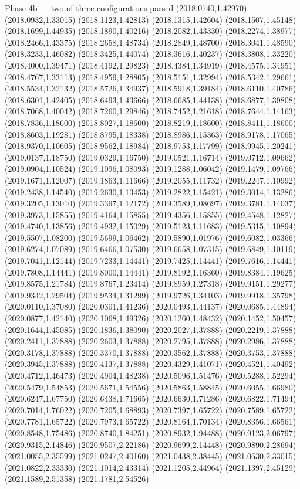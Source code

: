 \documentclass[aspectratio=169,10pt]{beamer}
\begin{document}
\begin{frame}[t]{Phase 4b — two of three configurations passed}
(2018.0740,1.42970) (2018.0932,1.33015) (2018.1123,1.42813) (2018.1315,1.42604) (2018.1507,1.45148) (2018.1699,1.44935) (2018.1890,1.40216) (2018.2082,1.43330) (2018.2274,1.38977) (2018.2466,1.43375) (2018.2658,1.48734) (2018.2849,1.48700) (2018.3041,1.48590) (2018.3233,1.46082) (2018.3425,1.44074) (2018.3616,1.40237) (2018.3808,1.33220) (2018.4000,1.39471) (2018.4192,1.29823) (2018.4384,1.34919) (2018.4575,1.34951) (2018.4767,1.33113) (2018.4959,1.28805) (2018.5151,1.32994) (2018.5342,1.29661) (2018.5534,1.32132) (2018.5726,1.34937) (2018.5918,1.39184) (2018.6110,1.40786) (2018.6301,1.42405) (2018.6493,1.43666) (2018.6685,1.44138) (2018.6877,1.39808) (2018.7068,1.40042) (2018.7260,1.29846) (2018.7452,1.21618) (2018.7644,1.14163) (2018.7836,1.18600) (2018.8027,1.18600) (2018.8219,1.18600) (2018.8411,1.18600) (2018.8603,1.19281) (2018.8795,1.18338) (2018.8986,1.15363) (2018.9178,1.17065) (2018.9370,1.10605) (2018.9562,1.18984) (2018.9753,1.17799) (2018.9945,1.20241) (2019.0137,1.18750) (2019.0329,1.16750) (2019.0521,1.16714) (2019.0712,1.09662) (2019.0904,1.10524) (2019.1096,1.08093) (2019.1288,1.06042) (2019.1479,1.09766) (2019.1671,1.12007) (2019.1863,1.11666) (2019.2055,1.11732) (2019.2247,1.10992) (2019.2438,1.14540) (2019.2630,1.13453) (2019.2822,1.15421) (2019.3014,1.13286) (2019.3205,1.13010) (2019.3397,1.12172) (2019.3589,1.08697) (2019.3781,1.14037) (2019.3973,1.15855) (2019.4164,1.15855) (2019.4356,1.15855) (2019.4548,1.12827) (2019.4740,1.13856) (2019.4932,1.15029) (2019.5123,1.11683) (2019.5315,1.10894) (2019.5507,1.08200) (2019.5699,1.06462) (2019.5890,1.01976) (2019.6082,1.03366) (2019.6274,1.07089) (2019.6466,1.07530) (2019.6658,1.07315) (2019.6849,1.10119) (2019.7041,1.12144) (2019.7233,1.14441) (2019.7425,1.14441) (2019.7616,1.14441) (2019.7808,1.14441) (2019.8000,1.14441) (2019.8192,1.16360) (2019.8384,1.19625) (2019.8575,1.21784) (2019.8767,1.23414) (2019.8959,1.27318) (2019.9151,1.29277) (2019.9342,1.29504) (2019.9534,1.31299) (2019.9726,1.34103) (2019.9918,1.35798) (2020.0110,1.37080) (2020.0301,1.41236) (2020.0493,1.44137) (2020.0685,1.44894) (2020.0877,1.42140) (2020.1068,1.49326) (2020.1260,1.48432) (2020.1452,1.50457) (2020.1644,1.45085) (2020.1836,1.38090) (2020.2027,1.37888) (2020.2219,1.37888) (2020.2411,1.37888) (2020.2603,1.37888) (2020.2795,1.37888) (2020.2986,1.37888) (2020.3178,1.37888) (2020.3370,1.37888) (2020.3562,1.37888) (2020.3753,1.37888) (2020.3945,1.37888) (2020.4137,1.37888) (2020.4329,1.41071) (2020.4521,1.40492) (2020.4712,1.46473) (2020.4904,1.48238) (2020.5096,1.51476) (2020.5288,1.52294) (2020.5479,1.54853) (2020.5671,1.54556) (2020.5863,1.58845) (2020.6055,1.66980) (2020.6247,1.67750) (2020.6438,1.71665) (2020.6630,1.71286) (2020.6822,1.71494) (2020.7014,1.76022) (2020.7205,1.68893) (2020.7397,1.65722) (2020.7589,1.65722) (2020.7781,1.65722) (2020.7973,1.65722) (2020.8164,1.70134) (2020.8356,1.66561) (2020.8548,1.75486) (2020.8740,1.84251) (2020.8932,1.94488) (2020.9123,2.06797) (2020.9315,2.14846) (2020.9507,2.22186) (2020.9699,2.14448) (2020.9890,2.28694) (2021.0055,2.35599) (2021.0247,2.40160) (2021.0438,2.38445) (2021.0630,2.33015) (2021.0822,2.33330) (2021.1014,2.43314) (2021.1205,2.44964) (2021.1397,2.45129) (2021.1589,2.51358) (2021.1781,2.54526) 
\end{frame}
\end{document}
